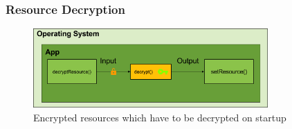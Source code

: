 \subsubsection{Resource Decryption} \label{subsection:counter-replace-encryption-content-resource}
\begin{figure}[h]
    \centering
    \includegraphics[width=0.8\textwidth]{data/encryptionResource.png}
    \caption{Encrypted resources which have to be decrypted on startup}
    \label{fig:encryptionResource}
\end{figure}
